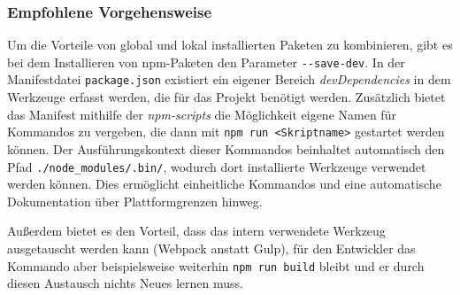 \subsubsection{Empfohlene Vorgehensweise}
Um die Vorteile von global und lokal installierten Paketen zu kombinieren, gibt es bei dem Installieren von npm-Paketen den Parameter \verb|--save-dev|.
In der Manifestdatei \verb|package.json| existiert ein eigener Bereich \emph{devDependencies} in dem Werkzeuge erfasst werden, die für das Projekt benötigt werden.
Zusätzlich bietet das Manifest mithilfe der \emph{npm-scripts} die Möglichkeit eigene Namen für Kommandos zu vergeben, die dann mit \verb|npm run <Skriptname>| gestartet werden können.
Der Ausführungskontext dieser Kommandos beinhaltet automatisch den Pfad \verb|./node_modules/.bin/|, wodurch dort installierte Werkzeuge verwendet werden können.
Dies ermöglicht einheitliche Kommandos und eine automatische Dokumentation über Plattformgrenzen hinweg.

Außerdem bietet es den Vorteil, dass das intern verwendete Werkzeug ausgetauscht werden kann (\zB Webpack anstatt Gulp), für den Entwickler das Kommando aber beispielsweise weiterhin \verb|npm run build| bleibt und er durch diesen Austausch nichts Neues lernen muss.
